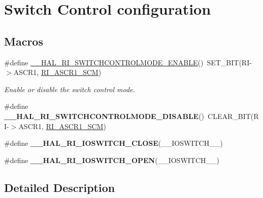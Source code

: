 \hypertarget{group___r_i___switch_control_config}{\section{Switch Control configuration}
\label{group___r_i___switch_control_config}
}
\subsection*{Macros}
\begin{DoxyCompactItemize}
\item 
\#define \hyperlink{group___r_i___switch_control_config_ga2aac480a08cbd6937ed3741a03796ac6}{\-\_\-\-\_\-\-H\-A\-L\-\_\-\-R\-I\-\_\-\-S\-W\-I\-T\-C\-H\-C\-O\-N\-T\-R\-O\-L\-M\-O\-D\-E\-\_\-\-E\-N\-A\-B\-L\-E}()~S\-E\-T\-\_\-\-B\-I\-T(R\-I-\/$>$A\-S\-C\-R1, \hyperlink{group___peripheral___registers___bits___definition_gaa61a2caf9bf76335404532180c033236}{R\-I\-\_\-\-A\-S\-C\-R1\-\_\-\-S\-C\-M})
\begin{DoxyCompactList}\small\item\em Enable or disable the switch control mode. \end{DoxyCompactList}\item 
\hypertarget{group___r_i___switch_control_config_ga41dca172ed53f7787a32d0f0b7a5e485}{\#define {\bfseries \-\_\-\-\_\-\-H\-A\-L\-\_\-\-R\-I\-\_\-\-S\-W\-I\-T\-C\-H\-C\-O\-N\-T\-R\-O\-L\-M\-O\-D\-E\-\_\-\-D\-I\-S\-A\-B\-L\-E}()~C\-L\-E\-A\-R\-\_\-\-B\-I\-T(R\-I-\/$>$A\-S\-C\-R1, \hyperlink{group___peripheral___registers___bits___definition_gaa61a2caf9bf76335404532180c033236}{R\-I\-\_\-\-A\-S\-C\-R1\-\_\-\-S\-C\-M})}\label{group___r_i___switch_control_config_ga41dca172ed53f7787a32d0f0b7a5e485}

\item 
\#define {\bfseries \-\_\-\-\_\-\-H\-A\-L\-\_\-\-R\-I\-\_\-\-I\-O\-S\-W\-I\-T\-C\-H\-\_\-\-C\-L\-O\-S\-E}(\-\_\-\-\_\-\-I\-O\-S\-W\-I\-T\-C\-H\-\_\-\-\_\-)
\item 
\#define {\bfseries \-\_\-\-\_\-\-H\-A\-L\-\_\-\-R\-I\-\_\-\-I\-O\-S\-W\-I\-T\-C\-H\-\_\-\-O\-P\-E\-N}(\-\_\-\-\_\-\-I\-O\-S\-W\-I\-T\-C\-H\-\_\-\-\_\-)
\end{DoxyCompactItemize}


\subsection{Detailed Description}


